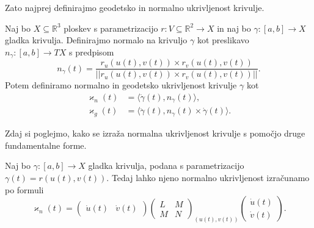Zato najprej definirajmo geodetsko in normalno ukrivljenost krivulje.

\begin{definicija}
\label{def_geodetska_in_normalna_ukrivljenost}
Naj bo $X \subseteq \mathbb{R}^3$ ploskev s parametrizacijo $r: V \subseteq \mathbb{R}^2 \to  X$ in naj bo $\gamma: [a,b] \to X$ gladka krivulja. 
Definirajmo normalo na krivuljo $\gamma$ kot preslikavo $n_{\gamma}: [a,b] \to  TX$ s predpisom
\begin{equation*} n_{\gamma}(t) = \frac{r_u(u(t), v(t)) \times  r_v(u(t), v(t))}{\lvert\lvert r_u(u(t), v(t)) \times  r_v(u(t), v(t)) \rvert\rvert }.\end{equation*}
Potem definiramo normalno in geodetsko ukrivljenost krivulje $\gamma$ kot 
\begin{align*}
    \varkappa_n(t) &= \langle \ddot{\gamma}(t), n_{\gamma}(t) \rangle,  \\
    \varkappa_g(t) &= \langle \ddot{\gamma}(t),  n_{\gamma}(t)  \times \dot{\gamma}(t) \rangle.
\end{align*}

\end{definicija}

Zdaj si poglejmo, kako se izraža normalna ukrivljenost krivulje s pomočjo druge fundamentalne forme.

\begin{izrek}
\label{izr_izrazava_normalne_ukrivljenosti_z_drugo_fundamentalno_formo}
  Naj bo $\gamma: [a,b] \to X$ gladka krivulja, podana s parametrizacijo $\gamma(t) = r(u(t), v(t))$. Tedaj lahko njeno normalno ukrivljenost
  izračunamo po formuli 
  \begin{equation*} \varkappa_n(t) = \begin{pmatrix}
    \dot{u}(t) & \dot{v}(t) 
  \end{pmatrix}  
  \begin{pmatrix}
    L & M \\
    M & N
  \end{pmatrix}_{(u(t), v(t))}  
  \begin{pmatrix}
    \dot{u}(t) \\
    \dot{v}(t) 
  \end{pmatrix}.  \end{equation*}
\end{izrek}

